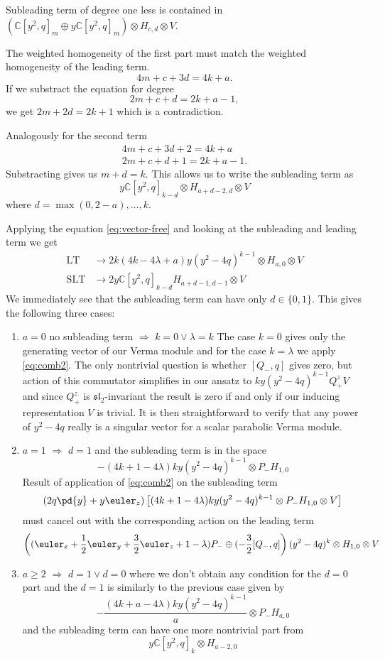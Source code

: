 \begin{appendices}
Subleading term of degree one less is contained in $(\mathbb{C}[y^2, q]_m \oplus y\mathbb{C}[y^2, q]_m)\otimes H_{c,d} \otimes V$.

The weighted homogeneity of the first part must match the weighted homogeneity of the leading term.
\[
4m + c + 3d = 4k + a.
\]
If we substract the equation for degree
\[
2m + c + d = 2k + a - 1,
\]
we get $2m + 2d = 2k + 1$ which is a contradiction.

Analogously for the second term
\begin{gather*}
4m + c + 3d + 2 = 4k + a \\
2m + c + d + 1= 2k + a - 1.
\end{gather*}
Substracting gives us $ m + d = k $. This allows us to write the subleading term as
\[
y\mathbb{C}[y^2, q]_{k-d}\otimes H_{a+d-2, d} \otimes V
\]
where $d = \max(0, 2-a), \ldots, k$.

Applying the equation \eqref{eq:vector-free} and looking at the subleading and leading term we get
\begin{align}
\mathrm{LT} &\longrightarrow 2k(4k - 4\lambda + a)y(y^2-4q)^{k-1}\otimes H_{a,0} \otimes V \\
\mathrm{SLT} &\longrightarrow 2y\mathbb{C}[y^2, q]_{k-d}H_{a+d-1, d-1} \otimes V
\end{align}
We immediately see that the subleading term can have only $d \in \{0, 1\}$. This gives the following three cases:
\begin{enumerate}
\item $a=0$ no subleading term $\Rightarrow$ $k=0 \vee \lambda = k$ The case $k=0$ gives only the generating vector of our Verma module and for the case $k=\lambda$ we apply \eqref{eq:comb2}. The only nontrivial question is whether $[Q_-, q]$ gives zero, but action of this commutator simplifies in our ansatz to $ky(y^2-4q)^{k-1}Q_+^z V$ and since $Q_+^z$ is $\mathfrak{sl}_2$-invariant the result is zero if and only if  our inducing representation $V$ is trivial. It is then straightforward to verify that any power of $y^2-4q$ really is a singular vector for a scalar parabolic Verma module.
\item $a=1$ $\Rightarrow$ $d=1$ and the subleading term is in the space
\[
    -(4k+1-4\lambda)ky(y^2-4q)^{k-1}\otimes P_- H_{1,0}
\]
Result of application of \eqref{eq:comb2} on the subleading term
\[
    (2q\pd{y} + y\euler_z) \left[ (4k+1-4\lambda)ky(y^2-4q)^{k-1}\otimes P_- H_{1,0} \otimes V \right]
\]
must cancel out with the corresponding action on the leading term
\[
\left((\euler_x + \frac{1}{2}\euler_y + \frac{3}{2}\euler_z + 1 - \lambda)P_- \oplus (-\frac{3}{2}[Q_-,q] \right) (y^2-4q)^k\otimes H_{1,0}\otimes V
\]
\item $a \geq 2$ $\Rightarrow$ $d=1 \vee d=0$ where we don't obtain any condition for the $d=0$ part and the $d=1$ is similarly to the previous case given by
\[
    -\frac{(4k+a-4\lambda)ky(y^2-4q)^{k-1}}{a}\otimes P_- H_{a,0}
\]
and the subleading term can have one more nontrivial part from
\[
    y\mathbb{C}[y^2,q]_k\otimes H_{a-2,0}
\]
\end{enumerate}


\end{appendices}
